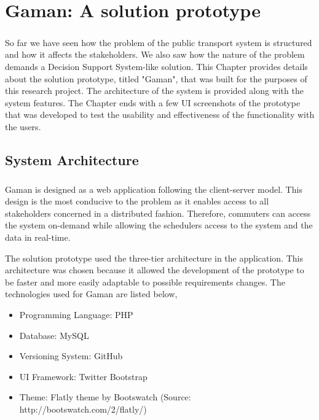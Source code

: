 
\chapter {Gaman: A solution prototype}
\label{chapter-SolutionPrototype}

\paragraph {} So far we have seen how the problem of the public transport system is structured and how it affects the stakeholders. We also saw how the nature of the problem demands a Decision Support System-like solution. This Chapter provides details about the solution prototype, titled "Gaman", that was built for the purposes of this research project. The architecture of the system is provided along with the system features. The Chapter ends with a few UI screenshots of the prototype that was developed to test the usability and effectiveness of the functionality with the users.

\section{System Architecture}

\paragraph{ } Gaman is designed as a web application following the client-server model. This design is the most conducive to the problem as it enables access to all stakeholders concerned in a distributed fashion. Therefore, commuters can access the system on-demand while allowing the schedulers access to the system and the data in real-time.

The solution prototype used the three-tier architecture in the application. This architecture was chosen because it allowed the development of the prototype to be faster and more easily adaptable to possible requirements changes. The technologies used for Gaman are listed below,

\begin {itemize}
\item Programming Language: PHP
\item Database: MySQL
\item Versioning System: GitHub
\item UI Framework: Twitter Bootstrap
\item Theme: Flatly theme by Bootswatch (Source: http://bootswatch.com/2/flatly/)
\end {itemize}


